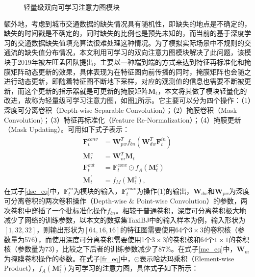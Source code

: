\begin{figure}[htbp] 
	\centering 
	\caption{轻量级双向可学习注意力图模块} \label{llbam}
\end{figure}

额外地，考虑到城市交通数据的缺失情况具有随机性，即缺失的地点是不确定的，缺失的时间戳是不确定的，同时缺失的比例也是预先未知的，而当前的基于深度学习的交通数据缺失值填充算法\cite{yu20193d,boquet2019missing}很难处理这种情况。为了模拟实际场景中不规则的交通流的缺失值分布情况，本文利用可学习的双向注意力图模块\cite{xie2019image}解决了此问题，该模块于2019年被左旺孟团队提出，主要以一种端到端的方式来达到特征再标准化和掩膜矩阵动态更新的效果，具体表现为在特征图向前传播的同时，掩膜矩阵也会随之进行动态更新，即随着特征图不断地下采样，对应的观测值的信息也需要不断被更新，而这个更新的指示器就是可更新的掩膜矩阵$\mathbf{M}_t$，本文将其做了模块轻量化的改进，故称为轻量级可学习注意力图，如图\ref{llbam}所示。它主要可以分为四个操作：（1）深度可分离卷积（Depth-wise Separable Convolution）；（2）掩膜卷积（Mask Convolution)；（3）特征再标准化（Feature Re-Normalization）；（4）掩膜更新（Mask Updating）。可用如下式子表示：
\vspace{-1em}
\begin{subequations}
\begin{align}
\mathbf{F}_{t}^{conv} & = \mathbf{W}^{T}_{pw}f_{bn}(\mathbf{W}^{T}_{dw}\mathbf{F}^{in}_t) \label{dsc_eq} \\
\mathbf{M}^{c}_{t} & = \mathbf{W}^{T}_{m}\mathbf{M}_t  \label{mc_eq}\\
\mathbf{F}_{t}^{out} & = \mathbf{F}_{t}^{conv} \odot f_{A}(\mathbf{M}^{c}_{t})  \label{fr_eq}\\
\mathbf{M}^{'}_{t} & = f_{M}(\mathbf{M}^{c}_{t}) \label{mu_eq},
\end{align}
\end{subequations}
在式子\eqref{dsc_eq}中，$\mathbf{F}^{in}_t$为模块的输入，$\mathbf{F}^{conv}_t$为操作(1)的输出，$\mathbf{W}_{dw}$和$\mathbf{W}_{pw}$为深度可分离卷积\cite{chollet2017xception}的两次卷积操作（Depth-wise $\&$ Point-wise Convolution）的参数，两次卷积中穿插了一个批标准化操作$f_{bn}$。相较于普通卷积，深度可分离卷积极大地减少了网络的训练参数，以本文的数据集TaxiBJ中的输入样本为例，输入形状为$[1,32,32]$，则输出形状为$[64,16,16]$的特征图需要使用64个$3 \times 3$的卷积核（参数量为576），而使用深度可分离卷积需要使用1个$3 \times 3$的卷积核和64个$1 \times 1$的卷积核（参数量为73），比较之下后者的训练参数减少了$87\%$。在式子\eqref{mc_eq}中，$\mathbf{W}_m$为掩膜卷积操作的参数。在式子\eqref{fr_eq}中，$\odot$表示哈达玛乘积（Element-wise Product），$f_{A}(\mathbf{M}^{c}_{t})$为可学习的注意力图，具体式子如下所示：
